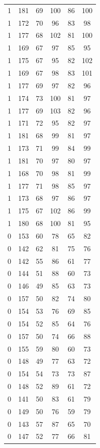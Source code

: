 \documentclass{article}
\begin{document}
\begin{spacing}{2}
\begin{center}
{\begin{longtable}{cccccc}
1   & 181 & 69  & 100 & 86  & 100 \\
1   & 172 & 70  & 96  & 83  & 98 \\
1   & 177 & 68  & 102 & 81  & 100 \\
1   & 169 & 67  & 97  & 85  & 95 \\
1   & 175 & 67  & 95  & 82  & 102 \\
1   & 169 & 67  & 98  & 83  & 101 \\
1   & 177 & 69  & 97  & 82  & 96 \\
1   & 174 & 73  & 100 & 81  & 97 \\
1   & 177 & 69  & 103 & 82  & 96 \\
1   & 171 & 72  & 95  & 82  & 97 \\
1   & 181 & 68  & 99  & 81  & 97 \\
1   & 173 & 71  & 99  & 84  & 99 \\
1   & 181 & 70  & 97  & 80  & 97 \\
1   & 168 & 70  & 98  & 81  & 99 \\
1   & 177 & 71  & 98  & 85  & 97 \\
1   & 173 & 68  & 97  & 86  & 97 \\
1   & 175 & 67  & 102 & 86  & 99 \\
1   & 180 & 68  & 100 & 81  & 95 \\
0   & 153 & 60  & 78  & 65  & 82 \\
0   & 142 & 62  & 81  & 75  & 76 \\
0   & 142 & 55  & 86  & 61  & 77 \\
0   & 144 & 51  & 88  & 60  & 73 \\
0   & 146 & 49  & 85  & 63  & 73 \\
0   & 157 & 50  & 82  & 74  & 80 \\
0   & 154 & 53  & 76  & 69  & 85 \\
0   & 154 & 52  & 85  & 64  & 76 \\
0   & 157 & 50  & 74  & 66  & 88 \\
0   & 155 & 59  & 80  & 60  & 73 \\
0   & 148 & 49  & 77  & 63  & 72 \\
0   & 154 & 54  & 73  & 73  & 87 \\
0   & 148 & 52  & 89  & 61  & 72 \\
0   & 141 & 50  & 83  & 61  & 79 \\
0   & 149 & 50  & 76  & 59  & 79 \\
0   & 143 & 57  & 87  & 65  & 70 \\
0   & 147 & 52  & 77  & 66  & 81 \\

\end{longtable}}
\end{center}
\end{spacing}
\end{document}
